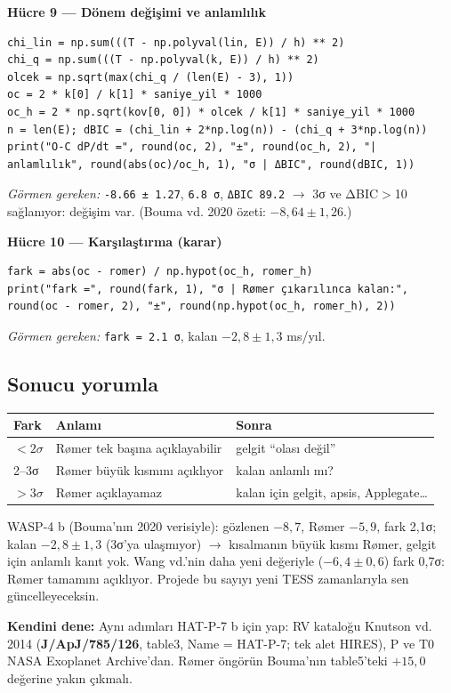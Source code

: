 \documentclass[11pt,a4paper]{article}
\begin{document}
\textbf{Hücre 9 — Dönem değişimi ve anlamlılık}
\begin{lstlisting}
chi_lin = np.sum(((T - np.polyval(lin, E)) / h) ** 2)
chi_q = np.sum(((T - np.polyval(k, E)) / h) ** 2)
olcek = np.sqrt(max(chi_q / (len(E) - 3), 1))
oc = 2 * k[0] / k[1] * saniye_yil * 1000
oc_h = 2 * np.sqrt(kov[0, 0]) * olcek / k[1] * saniye_yil * 1000
n = len(E); dBIC = (chi_lin + 2*np.log(n)) - (chi_q + 3*np.log(n))
print("O-C dP/dt =", round(oc, 2), "±", round(oc_h, 2), "| anlamlılık", round(abs(oc)/oc_h, 1), "σ | ΔBIC", round(dBIC, 1))
\end{lstlisting}
\emph{Görmen gereken:} \texttt{-8.66 ± 1.27}, \texttt{6.8 σ}, \texttt{ΔBIC 89.2} $\rightarrow$ 3σ ve ΔBIC$>$10 sağlanıyor: değişim var. (Bouma vd. 2020 özeti: $-8{,}64\pm1{,}26$.)

\textbf{Hücre 10 — Karşılaştırma (karar)}
\begin{lstlisting}
fark = abs(oc - romer) / np.hypot(oc_h, romer_h)
print("fark =", round(fark, 1), "σ | Rømer çıkarılınca kalan:", round(oc - romer, 2), "±", round(np.hypot(oc_h, romer_h), 2))
\end{lstlisting}
\emph{Görmen gereken:} \texttt{fark = 2.1 σ}, kalan $-2{,}8\pm1{,}3$ ms/yıl.

\subsection{Sonucu yorumla}
\begin{center}
\begin{tabular}{@{}lll@{}}
\toprule
Fark & Anlamı & Sonra \\ \midrule
$<2\sigma$ & Rømer tek başına açıklayabilir & gelgit ``olası değil'' \\
2--3σ & Rømer büyük kısmını açıklıyor & kalan anlamlı mı? \\
$>3\sigma$ & Rømer açıklayamaz & kalan için gelgit, apsis, Applegate\ldots \\ \bottomrule
\end{tabular}
\end{center}
WASP-4 b (Bouma'nın 2020 verisiyle): gözlenen $-8{,}7$, Rømer $-5{,}9$, fark 2,1σ; kalan $-2{,}8\pm1{,}3$ (3σ'ya ulaşmıyor) $\rightarrow$ kısalmanın büyük kısmı Rømer, gelgit için anlamlı kanıt yok. Wang vd.'nin daha yeni değeriyle ($-6{,}4\pm0{,}6$) fark 0,7σ: Rømer tamamını açıklıyor. Projede bu sayıyı yeni TESS zamanlarıyla sen güncelleyeceksin.

\textbf{Kendini dene:} Aynı adımları HAT-P-7 b için yap: RV kataloğu Knutson vd. 2014 (\textbf{J/ApJ/785/126}, table3, Name = HAT-P-7; tek alet HIRES), P ve T0 NASA Exoplanet Archive'dan. Rømer öngörün Bouma'nın table5'teki $+15{,}0$ değerine yakın çıkmalı.
\end{document}
